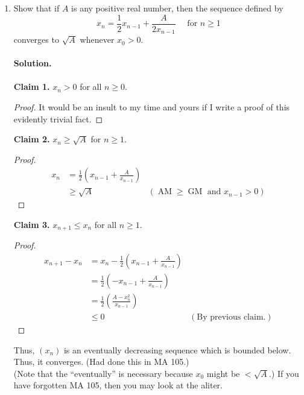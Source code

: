 \documentclass{article}
\begin{document}
\begin{enumerate}
	\item Show that if $A$ is any positive real number, then the sequence defined by 
	\[x_n = \frac{1}{2}x_{n-1} + \frac{A}{2x_{n-1}}\quad \text{ for } n \ge 1\]
	converges to $\sqrt{A}$ whenever $x_0 > 0.$\\~\\
	\textbf{Solution.}\\~\\
	\textbf{Claim 1.} $x_n > 0$ for all $n \ge 0.$
	\begin{proof}
	It would be an insult to my time and yours if I write a proof of this evidently trivial fact.
	\end{proof}
	\textbf{Claim 2.} $x_n \ge \sqrt{A}$ for $n \ge 1.$
	\begin{proof} 
		\begin{align*} 
			x_{n} &= \frac{1}{2}\left(x_{n-1} + \frac{A}{x_{n-1}}\right)\\
			& \ge \sqrt{A} & (\operatorname{AM} \ge \operatorname{GM} \text{ and } x_{n-1} > 0)
		\end{align*}
	\end{proof}
	\textbf{Claim 3.} $x_{n + 1} \le x_n$ for all $n \ge 1.$
	\begin{proof} 
		\begin{align*} 
			x_{n+1} - x_n &= x_n - \frac{1}{2}\left(x_{n-1} + \frac{A}{x_{n-1}}\right)\\
			&= \frac{1}{2}\left(-x_{n-1} + \frac{A}{x_{n-1}}\right)\\
			&= \frac{1}{2}\left(\frac{A - x_n^2}{x_{n-1}}\right)\\
			& \le 0 & (\text{By previous claim.})
		\end{align*}
	\end{proof}
	Thus, $(x_n)$ is an eventually decreasing sequence which is bounded below. Thus, it converges. \hfill (Had done this in MA 105.)\\
	(Note that the ``eventually'' is necessary because $x_0$ might be $< \sqrt{A}$.)
	If you have forgotten MA 105, then you may look at the aliter.

	\hrulefill


\end{enumerate}
\end{document}
